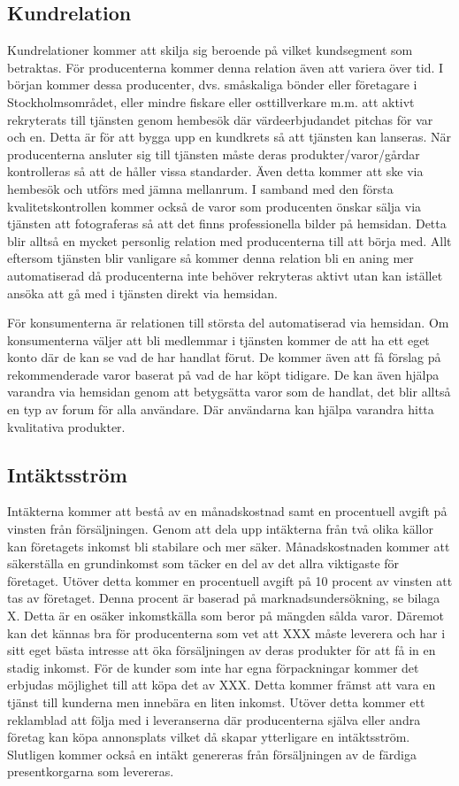 \documentclass[10pt,a4paper,oneside]{article}
\begin{document}
\subsection{Kundrelation}
Kundrelationer kommer att skilja sig beroende på vilket kundsegment som betraktas. För producenterna kommer denna relation även att variera över tid. I början kommer dessa producenter, dvs. småskaliga bönder eller företagare i Stockholmsområdet, eller mindre fiskare eller osttillverkare m.m. att aktivt rekryterats till tjänsten genom hembesök där värdeerbjudandet pitchas för var och en. Detta är för att bygga upp en kundkrets så att tjänsten kan lanseras. När producenterna ansluter sig till tjänsten måste deras produkter/varor/gårdar kontrolleras så att de håller vissa standarder. Även detta kommer att ske via hembesök och utförs med jämna mellanrum. I samband med den första kvalitetskontrollen kommer också de varor som producenten önskar sälja via tjänsten att fotograferas så att det finns professionella bilder på hemsidan. Detta blir alltså en mycket personlig relation med producenterna till att börja med. Allt eftersom tjänsten blir vanligare så kommer denna relation bli en aning mer automatiserad då producenterna inte behöver rekryteras aktivt utan kan istället ansöka att gå med i tjänsten direkt via hemsidan. 

För konsumenterna är relationen till största del automatiserad via hemsidan. Om konsumenterna väljer att bli medlemmar i tjänsten kommer de att ha ett eget konto där de kan se vad de har handlat förut. De kommer även att få förslag på rekommenderade varor baserat på vad de har köpt tidigare. De kan även hjälpa varandra via hemsidan genom att betygsätta varor som de handlat, det blir alltså en typ av forum för alla användare. Där användarna kan hjälpa varandra hitta kvalitativa produkter. 


\subsection{Intäktsström}
Intäkterna kommer att bestå av en månadskostnad samt en procentuell avgift på vinsten från försäljningen. Genom att dela upp intäkterna från två olika källor kan företagets inkomst bli stabilare och mer säker. Månadskostnaden kommer att säkerställa en grundinkomst som täcker en del av det allra viktigaste för företaget. Utöver detta kommer en procentuell avgift på 10 procent av vinsten att tas av företaget. Denna procent är baserad på marknadsundersökning, se bilaga X. Detta är en osäker inkomstkälla som beror på mängden sålda varor. Däremot kan det kännas bra för producenterna som vet att XXX måste leverera och har i sitt eget bästa intresse att öka försäljningen av deras produkter för att få in en stadig inkomst. För de kunder som inte har egna förpackningar kommer det erbjudas möjlighet till att köpa det av XXX. Detta kommer främst att vara en tjänst till kunderna men innebära en liten inkomst. Utöver detta kommer ett reklamblad att följa med i leveranserna där producenterna själva eller andra företag kan köpa annonsplats vilket då skapar ytterligare en intäktsström. Slutligen kommer också en intäkt genereras från försäljningen av de färdiga presentkorgarna som levereras. 
\end{document}

